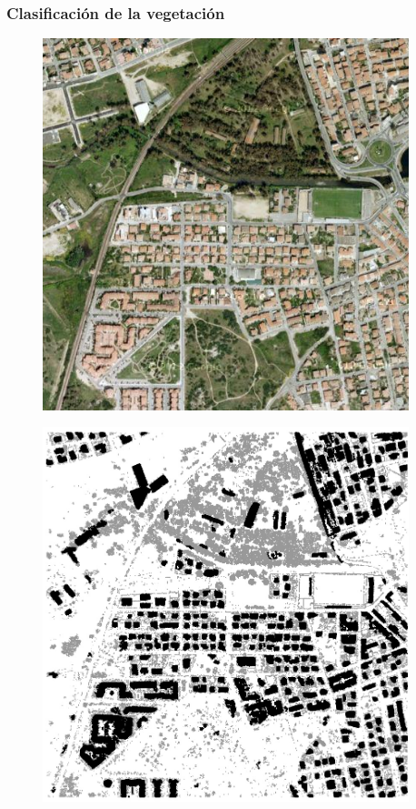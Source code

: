 \begin{frame}
  \frametitle{Clasificación de la vegetación}
  \begin{minipage}{0.45\textwidth}
    \begin{figure}[h!]
      \centering
      \includegraphics[width=0.95\textwidth]{images/olbia}
    \end{figure}
  \end{minipage}
  \begin{minipage}{0.45\textwidth}
    \begin{figure}[h!]
      \centering
      \includegraphics[width=0.95\textwidth]{images/olbia_veg_build}
    \end{figure}
  \end{minipage}
\end{frame}
